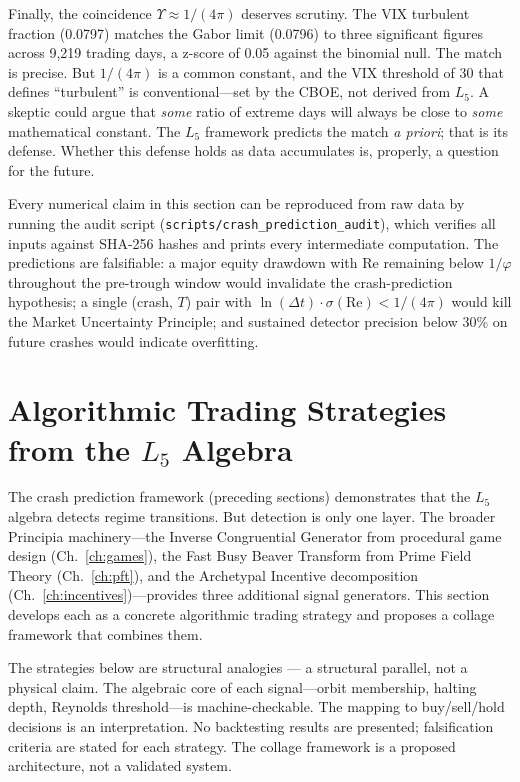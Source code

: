 Finally, the coincidence $\Upsilon \approx 1/(4\pi)$ deserves scrutiny. The VIX turbulent fraction (0.0797) matches the Gabor limit (0.0796) to three significant figures across 9{,}219 trading days, a z-score of 0.05 against the binomial null. The match is precise. But $1/(4\pi)$ is a common constant, and the VIX threshold of 30 that defines ``turbulent'' is conventional---set by the CBOE, not derived from $L_5$. A skeptic could argue that \emph{some} ratio of extreme days will always be close to \emph{some} mathematical constant. The $L_5$ framework predicts the match \emph{a priori}; that is its defense. Whether this defense holds as data accumulates is, properly, a question for the future.

Every numerical claim in this section can be reproduced from raw data by running the audit script (\texttt{scripts/crash\_prediction\_audit}), which verifies all inputs against SHA-256 hashes and prints every intermediate computation. The predictions are falsifiable: a major equity drawdown with Re remaining below $1/\varphi$ throughout the pre-trough window would invalidate the crash-prediction hypothesis; a single (crash, $T$) pair with $\ln(\Delta t) \cdot \sigma(\mathrm{Re}) < 1/(4\pi)$ would kill the Market Uncertainty Principle; and sustained detector precision below 30\% on future crashes would indicate overfitting.
\section{Algorithmic Trading Strategies from the $L_5$ Algebra}

The crash prediction framework (preceding sections) demonstrates that the $L_5$ algebra detects regime transitions. But detection is only one layer. The broader Principia machinery---the Inverse Congruential Generator from procedural game design (Ch.~\ref{ch:games}), the Fast Busy Beaver Transform from Prime Field Theory (Ch.~\ref{ch:pft}), and the Archetypal Incentive decomposition (Ch.~\ref{ch:incentives})---provides three additional signal generators. This section develops each as a concrete algorithmic trading strategy and proposes a collage framework that combines them.

\begin{remark}
The strategies below are structural analogies --- a structural parallel, not a physical claim. The algebraic core of each signal---orbit membership, halting depth, Reynolds threshold---is machine-checkable. The mapping to buy/sell/hold decisions is an interpretation. No backtesting results are presented; falsification criteria are stated for each strategy. The collage framework is a proposed architecture, not a validated system.
\end{remark}

